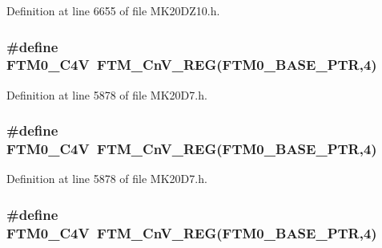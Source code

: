 Definition at line 6655 of file M\+K20\+D\+Z10.\+h.

\subsubsection[{\texorpdfstring{F\+T\+M0\+\_\+\+C4V}{FTM0_C4V}}]{\setlength{\rightskip}{0pt plus 5cm}\#define F\+T\+M0\+\_\+\+C4V~{\bf F\+T\+M\+\_\+\+Cn\+V\+\_\+\+R\+EG}({\bf F\+T\+M0\+\_\+\+B\+A\+S\+E\+\_\+\+P\+TR},4)}\hypertarget{group___f_t_m___register___accessor___macros_ga2ff8bc5a113f6c0988fd1b3053293670}{}\label{group___f_t_m___register___accessor___macros_ga2ff8bc5a113f6c0988fd1b3053293670}


Definition at line 5878 of file M\+K20\+D7.\+h.

\subsubsection[{\texorpdfstring{F\+T\+M0\+\_\+\+C4V}{FTM0_C4V}}]{\setlength{\rightskip}{0pt plus 5cm}\#define F\+T\+M0\+\_\+\+C4V~{\bf F\+T\+M\+\_\+\+Cn\+V\+\_\+\+R\+EG}({\bf F\+T\+M0\+\_\+\+B\+A\+S\+E\+\_\+\+P\+TR},4)}\hypertarget{group___f_t_m___register___accessor___macros_ga2ff8bc5a113f6c0988fd1b3053293670}{}\label{group___f_t_m___register___accessor___macros_ga2ff8bc5a113f6c0988fd1b3053293670}


Definition at line 5878 of file M\+K20\+D7.\+h.

\subsubsection[{\texorpdfstring{F\+T\+M0\+\_\+\+C4V}{FTM0_C4V}}]{\setlength{\rightskip}{0pt plus 5cm}\#define F\+T\+M0\+\_\+\+C4V~{\bf F\+T\+M\+\_\+\+Cn\+V\+\_\+\+R\+EG}({\bf F\+T\+M0\+\_\+\+B\+A\+S\+E\+\_\+\+P\+TR},4)}\hypertarget{group___f_t_m___register___accessor___macros_ga2ff8bc5a113f6c0988fd1b3053293670}{}\label{group___f_t_m___register___accessor___macros_ga2ff8bc5a113f6c0988fd1b3053293670}


